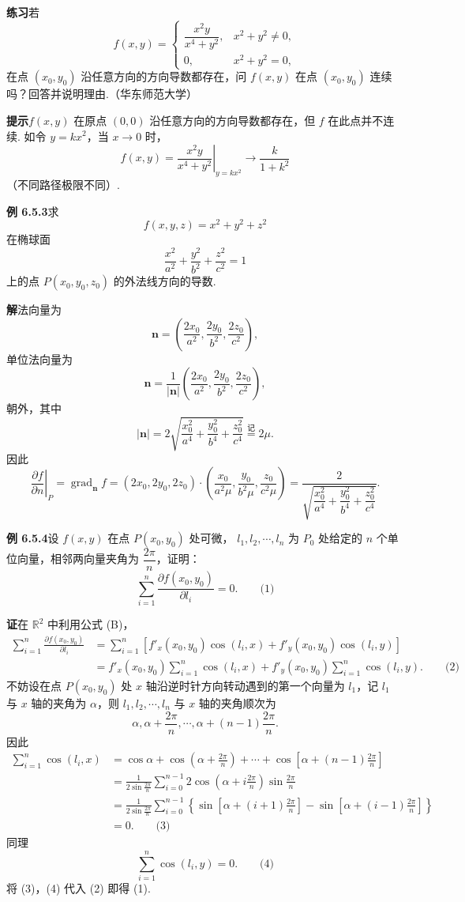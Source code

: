 \documentclass[UTF8,12pt,a4paper,fontset=fandol]{ctexart}
\begin{document}
\noindent\textbf{练习}\quad 若
\[
f(x,y)=
\begin{cases}
  \dfrac{x^2y}{x^4+y^2},&x^2+y^2\ne0,\\[6pt]
  0,&x^2+y^2=0,
\end{cases}
\]
在点 $(x_0,y_0)$ 沿任意方向的方向导数都存在，问 $f(x,y)$ 在点 $(x_0,y_0)$ 连续吗？回答并说明理由.（华东师范大学）

\noindent\textbf{提示}\quad $f(x,y)$ 在原点 $(0,0)$ 沿任意方向的方向导数都存在，但 $f$ 在此点并不连续. 如令 $y=kx^2$，当 $x\to0$ 时，
\[
  f(x,y)=\left.\frac{x^2y}{x^4+y^2}\right|_{y=kx^2}
  \to \frac{k}{1+k^2}
\]
（不同路径极限不同）.

\noindent\textbf{例 6.5.3}\quad 求
\[
  f(x,y,z)=x^2+y^2+z^2
\]
在椭球面
\[
  \frac{x^2}{a^2}+\frac{y^2}{b^2}+\frac{z^2}{c^2}=1
\]
上的点 $P(x_0,y_0,z_0)$ 的外法线方向的导数.

\noindent\textbf{解}\quad 法向量为
\[
  \mathbf n=\left(\frac{2x_0}{a^2},\frac{2y_0}{b^2},\frac{2z_0}{c^2}\right),
\]
单位法向量为
\[
  \mathbf n=\frac1{|\mathbf n|}
  \left(\frac{2x_0}{a^2},\frac{2y_0}{b^2},\frac{2z_0}{c^2}\right),
\]
朝外，其中
\[
  |\mathbf n|
  =2\sqrt{\frac{x_0^2}{a^4}+\frac{y_0^2}{b^4}+\frac{z_0^2}{c^4}}
  \overset{\text{记}}{=}2\mu.
\]
因此
\[
\left.\frac{\partial f}{\partial n}\right|_P
=\operatorname{grad}_{\mathbf n}f
=(2x_0,2y_0,2z_0)\cdot
\left(\frac{x_0}{a^2\mu},\frac{y_0}{b^2\mu},\frac{z_0}{c^2\mu}\right)
=
\frac{2}{\sqrt{\dfrac{x_0^2}{a^4}+\dfrac{y_0^2}{b^4}+\dfrac{z_0^2}{c^4}}}.
\]

\noindent\textbf{例 6.5.4}\quad 设 $f(x,y)$ 在点 $P(x_0,y_0)$ 处可微，
$l_1,l_2,\cdots,l_n$ 为 $P_0$ 处给定的 $n$ 个单位向量，相邻两向量夹角为
$\dfrac{2\pi}{n}$，证明：
\[
  \sum_{i=1}^n\frac{\partial f(x_0,y_0)}{\partial l_i}=0. \qquad\text{(1)}
\]

\noindent\textbf{证}\quad 在 $\mathbb R^2$ 中利用公式 (B)，
\[
\begin{aligned}
  \sum_{i=1}^n\frac{\partial f(x_0,y_0)}{\partial l_i}
  &=
  \sum_{i=1}^n\left[f'_x(x_0,y_0)\cos(l_i,x)
  +f'_y(x_0,y_0)\cos(l_i,y)\right]\\
  &=f'_x(x_0,y_0)\sum_{i=1}^n\cos(l_i,x)
  +f'_y(x_0,y_0)\sum_{i=1}^n\cos(l_i,y). \qquad\text{(2)}
\end{aligned}
\]
不妨设在点 $P(x_0,y_0)$ 处 $x$ 轴沿逆时针方向转动遇到的第一个向量为 $l_1$，记 $l_1$ 与 $x$ 轴的夹角为 $\alpha$，则
$l_1,l_2,\cdots,l_n$ 与 $x$ 轴的夹角顺次为
\[
  \alpha,\alpha+\frac{2\pi}{n},\cdots,\alpha+(n-1)\frac{2\pi}{n}.
\]
因此
\[
\begin{aligned}
  \sum_{i=1}^n\cos(l_i,x)
  &=
  \cos\alpha+\cos\left(\alpha+\frac{2\pi}{n}\right)+\cdots+
  \cos\left[\alpha+(n-1)\frac{2\pi}{n}\right]\\
  &=
  \frac1{2\sin\frac{2\pi}{n}}
  \sum_{i=0}^{n-1}
  2\cos\left(\alpha+i\frac{2\pi}{n}\right)\sin\frac{2\pi}{n}\\
  &=
  \frac1{2\sin\frac{2\pi}{n}}
  \sum_{i=0}^{n-1}
  \left\{
  \sin\left[\alpha+(i+1)\frac{2\pi}{n}\right]
  -
  \sin\left[\alpha+(i-1)\frac{2\pi}{n}\right]
  \right\}\\
  &=0. \qquad\text{(3)}
\end{aligned}
\]
同理
\[
  \sum_{i=1}^n\cos(l_i,y)=0. \qquad\text{(4)}
\]
将 (3)，(4) 代入 (2) 即得 (1).
\end{document}
